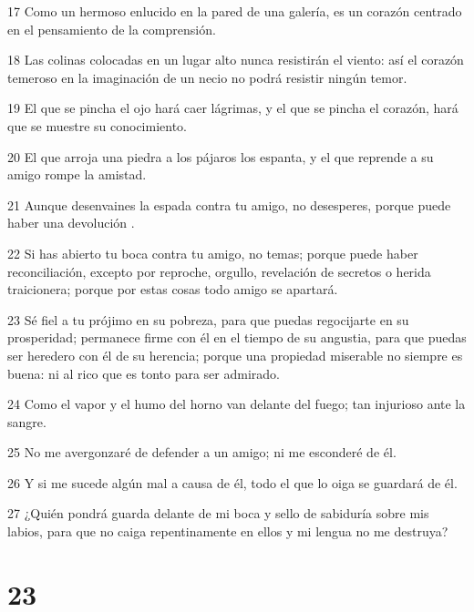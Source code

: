 \par 17 Como un hermoso enlucido en la pared de una galería, es un corazón centrado en el pensamiento de la comprensión.
\par 18 Las colinas colocadas en un lugar alto nunca resistirán el viento: así el corazón temeroso en la imaginación de un necio no podrá resistir ningún temor.
\par 19 El que se pincha el ojo hará caer lágrimas, y el que se pincha el corazón, hará que se muestre su conocimiento.
\par 20 El que arroja una piedra a los pájaros los espanta, y el que reprende a su amigo rompe la amistad.
\par 21 Aunque desenvaines la espada contra tu amigo, no desesperes, porque puede haber una devolución .
\par 22 Si has abierto tu boca contra tu amigo, no temas; porque puede haber reconciliación, excepto por reproche, orgullo, revelación de secretos o herida traicionera; porque por estas cosas todo amigo se apartará.
\par 23 Sé fiel a tu prójimo en su pobreza, para que puedas regocijarte en su prosperidad; permanece firme con él en el tiempo de su angustia, para que puedas ser heredero con él de su herencia; porque una propiedad miserable no siempre es buena: ni al rico que es tonto para ser admirado.
\par 24 Como el vapor y el humo del horno van delante del fuego; tan injurioso ante la sangre.
\par 25 No me avergonzaré de defender a un amigo; ni me esconderé de él.
\par 26 Y si me sucede algún mal a causa de él, todo el que lo oiga se guardará de él.
\par 27 ¿Quién pondrá guarda delante de mi boca y sello de sabiduría sobre mis labios, para que no caiga repentinamente en ellos y mi lengua no me destruya?

\chapter{23}

